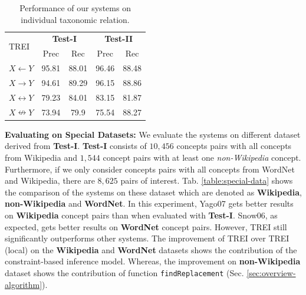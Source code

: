 \begin{table}[!t]
  \begin{center}
    \begin{tabular}{l|c|c||c|c}
      \multirow{2}{*}{TREI}  & \multicolumn{2}{c}{{\bf Test-I}} & \multicolumn{2}{|c}{{\bf Test-II}} \\
      \cline{2-5}
      &  Prec & Rec &  Prec &  Rec  \\
      \hline
      $X \leftarrow Y$       & 95.81 & 88.01 & 96.46 & 88.48 \\
      $X \rightarrow Y$      & 94.61 & 89.29 & 96.15 & 88.86 \\
      $X \leftrightarrow Y$  & 79.23 & 84.01 & 83.15 & 81.87 \\
      $X \nleftrightarrow Y$ & 73.94 &  79.9 & 75.54 & 88.27 \\
    \end{tabular}
    \caption{Performance of our systems on individual taxonomic relation.}
    \label{tab:ind-rel}
  \end{center}
\end{table}


{\bf Evaluating on Special Datasets:} We evaluate the systems on
different dataset derived from {\bf Test-I}.  {\bf Test-I} consists of
$10,456$ concepts pairs with all concepts from Wikipedia and $1,544$
concept pairs with at least one {\em non-Wikipedia} concept.
Furthermore, if we only consider concepts pairs with all concepts from
WordNet and Wikipedia, there are $8,625$ pairs of interest.
Tab. \ref{table:special-data} shows the comparison of the systems on
these dataset which are denoted as {\bf Wikipedia}, {\bf
  non-Wikipedia} and {\bf WordNet}.  In this experiment, Yago07 gets
better results on {\bf Wikipedia} concept pairs than when evaluated
with {\bf Test-I}.  Snow06, as expected, gets better results on {\bf
  WordNet} concept pairs.  However, TREI still significantly
outperforms other systems. The improvement of TREI over TREI (local)
on the {\bf Wikipedia} and {\bf WordNet} datasets shows the
contribution of the constraint-based inference model. Whereas, the
improvement on {\bf non-Wikipedia} dataset shows the contribution of
function \texttt{findReplacement} (Sec. \ref{sec:overview-algorithm}).


